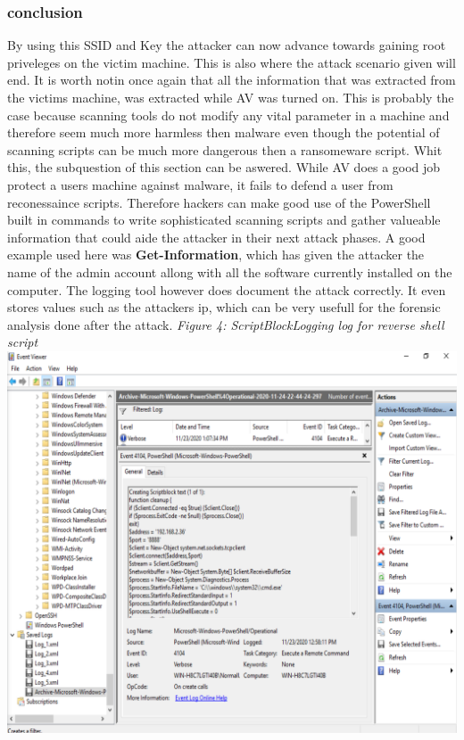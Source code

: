 \documentclass{article}%
\begin{document}
\subsubsection{conclusion}
By using this SSID and Key the attacker can now advance towards gaining root priveleges on the victim machine. This is also where the attack scenario given will end. It is worth notin once again that all the information that was extracted from the victims machine, was extracted while AV was turned on. This is probably the case because scanning tools do not modify any vital parameter in a machine and therefore seem much more harmless then malware even though the potential of scanning scripts can be much more dangerous then a ransomeware script. Whit this, the subquestion of this section can be aswered. While AV does a good job protect a users machine against malware, it fails to defend a user from reconessaince scripts. Therefore hackers can make good use of the PowerShell built in commands to write sophisticated scanning scripts and gather valueable information that could aide the attacker in their next attack phases. A good example used here was \textbf{Get-Information}, which has given the attacker the name of the admin account allong with all the software currently installed on the computer. The logging tool however does document the attack correctly. It even stores values such as the attackers ip, which can be very usefull for the forensic analysis done after the attack.\newpage
\textit{Figure 4: ScriptBlockLogging log for reverse shell script}\\
\includegraphics[scale=0.45]{20.png}
\end{document}
